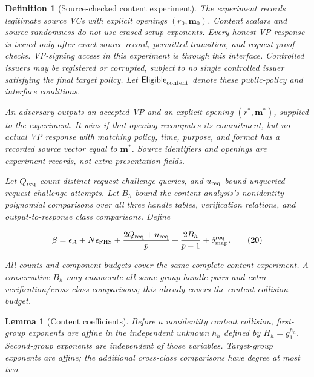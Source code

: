 \documentclass[11pt]{article}
\newtheorem{definition}{Definition}
\newtheorem{lemma}{Lemma}
\begin{document}
\begin{definition}[Source-checked content experiment]
The experiment records legitimate source VCs with explicit openings \((r_0,\boldsymbol m_0)\). Content scalars and source randomness do not use erased setup exponents. Every honest VP response is issued only after exact source-record, permitted-transition, and request-proof checks. VP-signing access in this experiment is through this interface. Controlled issuers may be registered or corrupted, subject to no single controlled issuer satisfying the final target policy. Let \(\mathsf{Eligible}_{\rm content}\) denote these public-policy and interface conditions.

An adversary outputs an accepted VP and an explicit opening \((r^*,\boldsymbol m^*)\), supplied to the experiment. It wins if that opening recomputes its commitment, but no actual VP response with matching policy, time, purpose, and format has a recorded source vector equal to \(\boldsymbol m^*\). Source identifiers and openings are experiment records, not extra presentation fields.

Let \(Q_{\rm req}\) count distinct request-challenge queries, and \(u_{\rm req}\) bound unqueried request-challenge attempts. Let \(B_h\) bound the content analysis's nonidentity polynomial comparisons over all three handle tables, verification relations, and output-to-response class comparisons. Define

\[
\beta=\epsilon_A+N\epsilon_{\rm FHS}
+\frac{2Q_{\rm req}+u_{\rm req}}p
+\frac{2B_h}{p-1}+\delta_{\rm map}^{\rm req}.
\tag{20}
\]

All counts and component budgets cover the same complete content experiment. A conservative \(B_h\) may enumerate all same-group handle pairs and extra verification/cross-class comparisons; this already covers the content collision budget.

\end{definition}
\begin{lemma}[Content coefficients]
Before a nonidentity content collision, first-group exponents are affine in the independent unknown \(h_h\) defined by \(H_h=g_1^{h_h}\). Second-group exponents are independent of those variables. Target-group exponents are affine; the additional cross-class comparisons have degree at most two.

\end{lemma}
\end{document}
